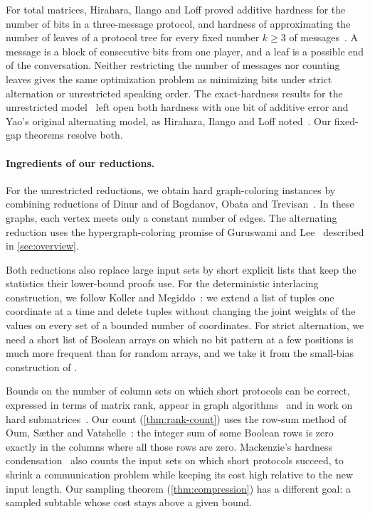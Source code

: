 \documentclass[11pt,letterpaper]{article} \usepackage[utf8]{inputenc}
\theoremstyle{plain} \newtheorem{theorem}{Theorem}[section]
\theoremstyle{definition} \newaliascnt{definition}{theorem}
\begin{document}
For total matrices,
Hirahara, Ilango and Loff proved additive hardness for the number of
bits in a three-message protocol, and hardness of approximating the
number of leaves of a protocol tree for every fixed number $k\ge3$ of
messages~\cite{hirahara2021constant}. A message is a block of
consecutive bits from one player, and a leaf is a possible end of the
conversation. Neither restricting the number of messages nor counting
leaves gives the same optimization problem as minimizing bits under
strict alternation or unrestricted speaking order. The exact-hardness
results for the unrestricted
model~\cite{gaspers-he-mackenzie-npcc,hirahara2025communication} left open
both hardness with one bit of additive error and Yao's original
alternating model, as Hirahara, Ilango and Loff
noted~\cite{hirahara2025communication}. Our fixed-gap theorems resolve both.

\paragraph{Ingredients of our reductions.}
For the unrestricted reductions, we obtain hard graph-coloring instances
by combining reductions of Dinur and of Bogdanov, Obata and
Trevisan~\cite{dinur2007pcp,bogdanov2002lower}. In these graphs, each
vertex meets only a constant number of edges. The alternating reduction
uses the hypergraph-coloring promise of Guruswami and
Lee~\cite{guruswami2018balanced} described in \cref{sec:overview}.

Both reductions also replace large input sets by short explicit lists
that keep the statistics their lower-bound proofs use. For the deterministic
interlacing construction, we follow Koller and
Megiddo~\cite[Section~3]{koller1994sample}: we extend a list of tuples one
coordinate at a time and delete tuples without changing the joint
weights of the values on every set of a bounded number of coordinates. For strict alternation, we need a short list of Boolean arrays on which
no bit pattern at a few positions is much more frequent than for random
arrays, and we take it from the small-bias construction of
\citet*{alon1992smallbias}.

Bounds on the number of column sets on which short protocols can be
correct, expressed in terms of matrix rank, appear in graph algorithms~\cite{bui2010rankwidth,oum2014faster}
and in work on hard submatrices~\cite{hrubes2025hard}. Our count (\cref{thm:rank-count}) uses the
row-sum method of Oum, S{\ae}ther and
Vatshelle~\cite{oum2014faster}: the integer sum of some Boolean rows is zero
exactly in the columns where all those rows are zero. Mackenzie's hardness
condensation~\cite{mackenzie2026condensation} also counts the input sets
on which short protocols succeed, to shrink a communication problem while
keeping its cost high relative to the new input length. Our sampling
theorem (\cref{thm:compression}) has a different goal: a sampled
subtable whose cost stays above a given bound.
\end{document}
